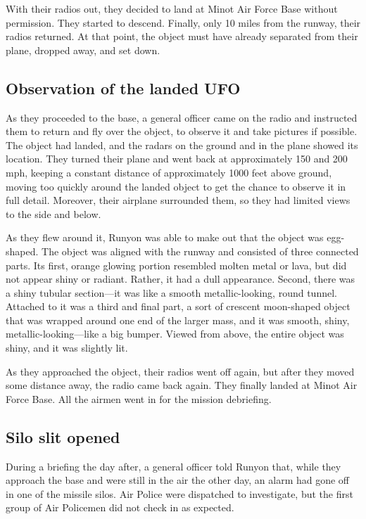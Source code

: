 With their radios out, they decided to land at Minot Air Force Base without permission. They started to descend. Finally, only 10 miles from the runway, their radios returned.
At that point, the object must have already separated from their plane, dropped away, and set down.

\subsection{Observation of the landed UFO}

As they proceeded to the base, a general officer came on the radio and instructed them to return and fly over the object, to observe it and take pictures if possible.
The object had landed, and the radars on the ground and in the plane showed its location.
They turned their plane and went back at approximately 150 and 200 mph, keeping a constant distance of approximately 1000 feet above ground,
moving too quickly around the landed object to get the chance to observe it in full detail.
Moreover, their airplane surrounded them, so they had limited views to the side and below.

As they flew around it, Runyon was able to make out that the object was egg-shaped.
The object was aligned with the runway and consisted of three connected parts.
Its first, orange glowing portion resembled molten metal or lava,
but did not appear shiny or radiant. Rather, it had a dull appearance.
Second, there was a shiny tubular section---it was like a smooth
metallic-looking, round tunnel. Attached to it was a third and final part,
a sort of crescent moon-shaped
object that was wrapped around one end of the larger mass, and it
was smooth, shiny, metallic-looking---like a big bumper.
Viewed from above, the entire object was shiny, and it was slightly lit.

As they approached the object, their radios went off again, but after they moved some distance away, the radio came back again.
They finally landed at Minot Air Force Base. All the airmen went in for the mission debriefing.


\subsection{Silo slit opened}

During a briefing the day after, a general officer told Runyon that,
while they approach the base and were still in the air the other day,
an alarm had gone off in one of the missile silos.
Air Police were dispatched to investigate, but the first group of Air Policemen did not check in as expected.

